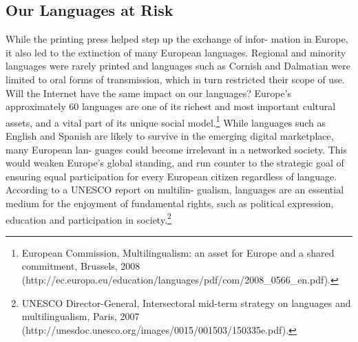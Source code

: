 \documentclass[]{../metanetpaper}
\begin{document}
\subsection{Our Languages at Risk}
While the printing press helped step up the exchange of infor-
mation in Europe, it also led to the extinction of many European
languages. Regional and minority languages were rarely printed
and languages such as Cornish and Dalmatian were limited to oral
forms of transmission, which in turn restricted their scope of use.
Will the Internet have the same impact on our languages?
Europe’s approximately 60 languages are one of its richest and
most important cultural assets, and a vital part of its unique social
model.\footnote{European Commission, Multilingualism: an asset for Europe and a shared commitment, Brussels,
2008 (http://ec.europa.eu/education/languages/pdf/com/2008\_0566\_en.pdf).}
 While languages such as English and Spanish are likely to
survive in the emerging digital marketplace, many European lan-
guages could become irrelevant in a networked society. This would
weaken Europe’s global standing, and run counter to the strategic
goal of ensuring equal participation for every European citizen
regardless of language. According to a UNESCO report on multilin-
gualism, languages are an essential medium for the enjoyment of
fundamental rights, such as political expression, education and
participation in society.\footnote{UNESCO Director-General, Intersectoral mid-term strategy on languages and multilingualism, Paris, 2007 (http://unesdoc.unesco.org/images/0015/001503/150335e.pdf).}
\end{document}
